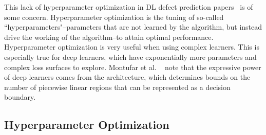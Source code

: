 \documentclass[10pt,compsoc,twocolumn]{IEEEtran}
\begin{document}
 This lack of hyperparameter optimization in DL defect prediction  papers~\cite{wang2016automatically,dam2019lessons, wang2018deep}
is of some concern.
Hyperparameter optimization is the tuning of so-called ``hyperparameters"--parameters that are not learned by the algorithm, but instead drive the working of the algorithm--to attain optimal performance.  
Hyperparameter optimization is very useful when using complex   learners.
This is especially true for deep learners, which have exponentially more parameters and complex loss surfaces to explore. Montufar et al. ~\cite{montufar2014number} note that the expressive power of deep learners comes from the architecture, which determines bounds on the number of piecewise linear regions that can be represented as a decision boundary.


\subsection{Hyperparameter Optimization}

    

\end{document}
